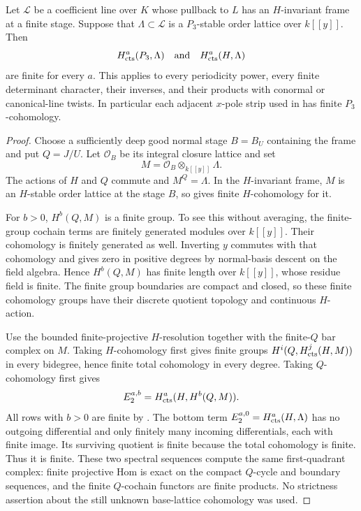 \begin{corollary}\label{h3:co:base-lattices}
Let $\mathcal L$ be a coefficient line over $K$ whose pullback to $L$
has an $H$-invariant frame at a finite stage.  Suppose that
$\Lambda\subset\mathcal L$ is a $P_3$-stable order lattice over
$k[[y]]$.  Then
\[
 H^a_{\mathrm{cts}}(P_3,\Lambda)
 \quad\text{and}\quad H^a_{\mathrm{cts}}(H,\Lambda)
\]
are finite for every $a$.  This applies to every periodicity power,
every finite determinant character, their inverses, and their products
with conormal or canonical-line twists.  In particular each adjacent
$x$-pole strip used in  has finite $P_3$-cohomology.
\end{corollary}

\begin{proof}
Choose a sufficiently deep good normal stage $B=B_U$ containing the
frame and put $Q=J/U$.  Let $\mathcal O_B$ be its integral closure
lattice and set
\[
 M=\mathcal O_B\otimes_{k[[y]]}\Lambda.
\]
The actions of $H$ and $Q$ commute and $M^Q=\Lambda$.
In the $H$-invariant frame, $M$ is an $H$-stable order lattice at the
stage $B$, so  gives finite
$H$-cohomology for it.

For $b>0$, $H^b(Q,M)$ is a finite group.  To see this without averaging,
the finite-group cochain terms are finitely generated modules over
$k[[y]]$.  Their cohomology is finitely generated as well.  Inverting
$y$ commutes with that cohomology and gives zero in positive degrees
by normal-basis descent on the field algebra.  Hence $H^b(Q,M)$ has
finite length over $k[[y]]$, whose residue field is finite.  The finite
group boundaries are compact and closed, so these finite cohomology
groups have their discrete quotient topology and continuous $H$-action.

Use the bounded finite-projective $H$-resolution together with the
finite-$Q$ bar complex on $M$.  Taking $H$-cohomology first gives finite
groups $H^i(Q,H^j_{\mathrm{cts}}(H,M))$ in every bidegree, hence finite total
cohomology in every degree.  Taking $Q$-cohomology first gives
\[
 E_2^{a,b}=H^a_{\mathrm{cts}}(H,H^b(Q,M)).
\]
All rows with $b>0$ are finite by
.  The bottom term
$E_2^{a,0}=H^a_{\mathrm{cts}}(H,\Lambda)$ has no outgoing differential and
only finitely many incoming differentials, each with finite image.
Its surviving quotient is finite because the total cohomology is
finite.  Thus it is finite.  These two spectral sequences compute the
same first-quadrant complex: finite projective Hom is exact on the
compact $Q$-cycle and boundary sequences, and the finite $Q$-cochain
functors are finite products.  No strictness assertion about the still
unknown base-lattice cohomology was used.


\end{proof}

